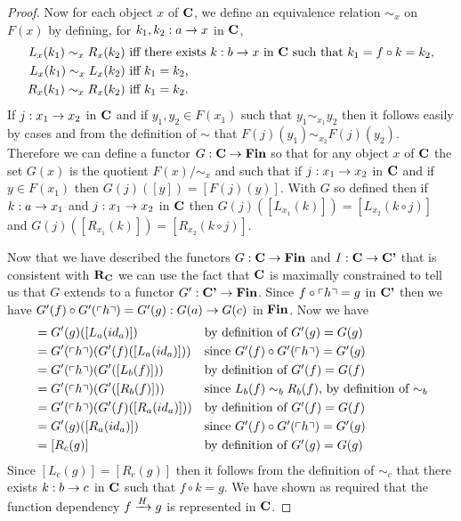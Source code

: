 \begin{proof}
Now for each object $x$ of $\catc$, we define an equivalence relation $\sim_x$ on $F(x)$ by defining,
for $k_1,k_2:a \morph x$ in $\catc$,
\begin{align*}
L_x(k_1) \sim_x R_x(k_2) & \mbox{ iff there exists $k:b \morph x$ in $\catc$ such that $k_1 = f \circ k = k_2$,}\\
L_x(k_1) \sim_x L_x(k_2) & \mbox{ iff $k_1 = k_2$,} \\
R_x(k_1) \sim_x R_x(k_2) & \mbox{ iff $k_1 = k_2$.} \\
\end{align*}
If $j: x_1 \morph x_2$ in $\catc$ and if $y_1,y_2 \in F(x_1)$ such that $y_1 \sim_{x_1} y_2$
then it follows easily by cases and from the definition of $\sim$ that $F(j)(y_1) \sim_{x_2} F(j)(y_2)$.
Therefore we can define a functor 
 $G: \catc \morph \Fin$  so that for any object $x$ of $\catc$
the set $G(x)$ is the quotient $F(x)/{\sim_x}$ and such that 
if $j: x_1 \morph x_2$ in $\catc$ and if $y \in F(x_1)$ then $G(j)([y])=[F(j)(y)]$.
With $G$ so defined then if $k: a \morph x_1$ and $j:x_1 \morph x_2$ in $\catc$
then  $G(j)([L_{x_1}(k)])=[L_{x_2}(k \circ j)]$ and $G(j)([R_{x_1}(k)])=[R_{x_2}(k \circ j)]$. 

Now that we have described the functors  $G: \catc \morph \Fin$ and $I:\catc \morph \catcp$ that is consistent with $\reqtc$
we can use the fact that $\catc$ is maximally constrained to tell us that $G$ extends to a functor 
$G' : \catcp \morph \Fin$. Since $f \circ \qq{h} = g$ in $\catcp$ then we have
 $G'(f) \circ G'(\qq{h}) = G'(g): G(a) \morph G(c)$ in $\Fin$.
Now we have
\begin{align*}
[L_c(g)]&= G'(g)([L_a(id_a)])              & & \mbox{by definition of $G'(g)=G(g)$}           \\
        &= G'(\qq{h}) (G'(f)([L_a(id_a)])) & & \mbox{since $G'(f) \circ G'(\qq{h}) = G'(g)$}  \\
				&= G'(\qq{h}) (G'([L_b(f)]))       & & \mbox{by definition of $G'(f)=G(f)$}           \\
				&= G'(\qq{h}) (G'([R_b(f)]))       & & \mbox{since $L_b(f) \sim_b R_b(f)$, by definition of $\sim_b$} \\
				&= G'(\qq{h}) (G'(f)([R_a(id_a)])) & & \mbox{by definition of $G'(f)=G(f)$}           \\
		    &= G'(g)([R_a(id_a)])              & & \mbox{since $G'(f) \circ G'(\qq{h}) = G'(g)$}  \\
				&= [R_c(g)]                        & & \mbox{by definition of $G'(g)=G(g)$}           \\
\end{align*} 
Since $[L_c(g)]=[R_c(g)]$ then it follows from the definition of $\sim_c$ that there exists $k:b \morph c$ in 
$\catc$ such that $f \circ k = g$.    We have shown as required that the function dependency
$\fundep{H}{f}{g}$ is represented in $\catc$.

\end{proof}

